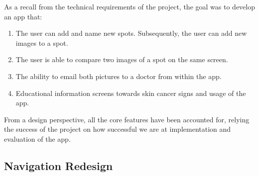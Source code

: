 As a recall from the technical requirements of the project, the goal was to develop an app that:
\begin{enumerate}
        \item The user can add and name new spots. Subsequently, the user can add new images to a spot.
        \item The user is able to compare two images of a spot on the same screen.
        \item The ability to email both pictures to a doctor from within the app.
        \item Educational information screens towards skin cancer signs and usage of the app.
    \end{enumerate}
From a design perspective, all the core features have been accounted for, relying the success of the project on how successful we are at implementation and evaluation of the app.

\subsection{Navigation Redesign}
\label{nav_refactor}

